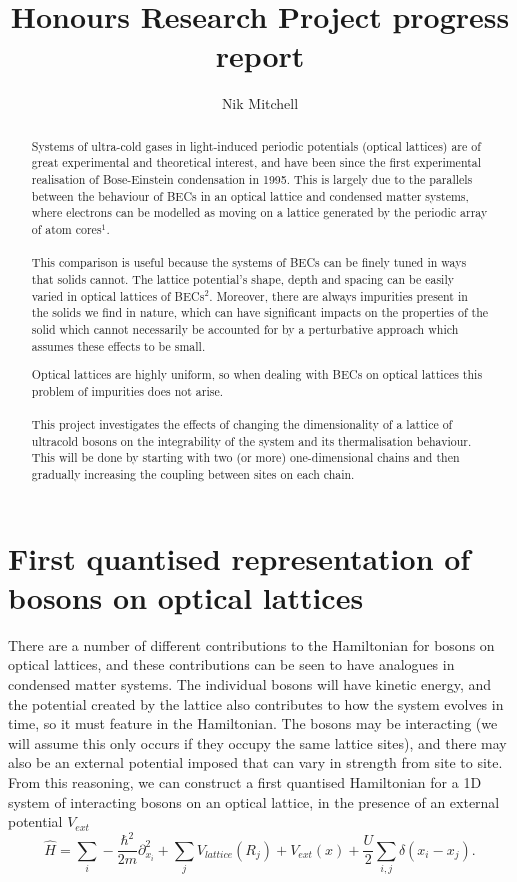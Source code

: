 \documentclass[a4paper,10pt]{article}
\title{Honours Research Project progress report}
\author{Nik Mitchell}
\begin{document}
\maketitle

\begin{abstract}

Systems of ultra-cold gases in light-induced periodic potentials (optical lattices) are of great experimental and theoretical interest, and have been since the first experimental 
realisation of Bose-Einstein condensation in 1995.
This is largely due to the parallels between the behaviour of BECs in an optical lattice and condensed matter systems, where 
electrons can be modelled as moving on a lattice generated by the periodic array of atom cores$^1$. 
\\\\
This comparison is useful because the systems of BECs can be finely tuned in ways that solids cannot. The lattice potential's shape, depth and spacing can be easily varied in optical lattices of BECs$^2$. 
Moreover, there are always impurities present in the solids we find in nature,
which can have significant impacts on the properties of the solid which cannot necessarily be accounted for by a perturbative approach which assumes these effects 
to be small. %

Optical lattices are highly uniform, so when dealing with BECs on optical lattices this problem of impurities does not arise.
\\\\
This project investigates the effects of changing the dimensionality of a lattice of ultracold bosons on the integrability of the system and its thermalisation behaviour. 
This will be done by starting with two (or more) one-dimensional chains and then gradually increasing the coupling
between sites on each chain.


\end{abstract}
\newpage
\section{First quantised representation of bosons on optical lattices}
There are a number of different contributions to the Hamiltonian for bosons on optical lattices, and these contributions can be seen to have analogues in condensed matter systems.
The individual bosons will have kinetic energy, and the potential created by the lattice also contributes to how the system evolves in time, so it must feature in the Hamiltonian.
The bosons may be interacting (we will assume this only occurs if they occupy the same lattice sites), and there may also be an external potential imposed that can vary in strength
from site to site. From this reasoning, we can construct a first quantised Hamiltonian for a 1D system of interacting bosons on an optical lattice, in the presence of an external potential $V_{ext}$
\begin{equation}
 \hat{H}=\sum_{i}-\frac{\hbar^{2}}{2m}  \partial_{x_{i}}^2+\sum_{j}V_{lattice}(R_{j})+V_{ext}(x)+\frac{U}{2}\sum_{i,j}\delta(x_{i}-x_{j}).
\end{equation}
\end{document}
